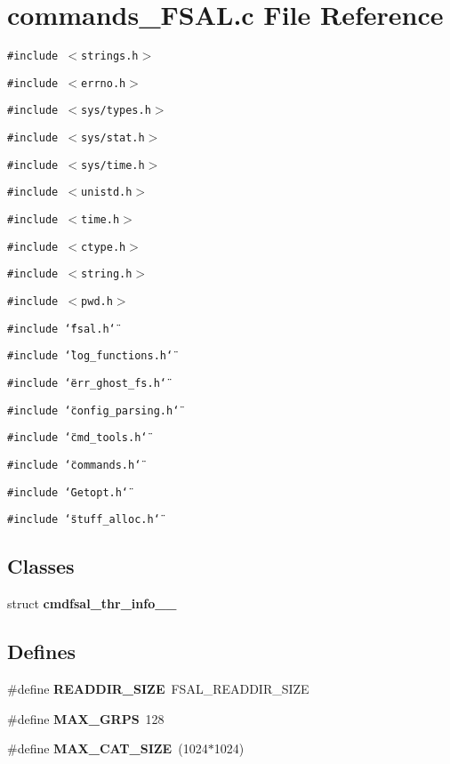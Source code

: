\section{commands\_\-FSAL.c File Reference}
\label{commands__FSAL_8c}
{\tt \#include $<$strings.h$>$}\par
{\tt \#include $<$errno.h$>$}\par
{\tt \#include $<$sys/types.h$>$}\par
{\tt \#include $<$sys/stat.h$>$}\par
{\tt \#include $<$sys/time.h$>$}\par
{\tt \#include $<$unistd.h$>$}\par
{\tt \#include $<$time.h$>$}\par
{\tt \#include $<$ctype.h$>$}\par
{\tt \#include $<$string.h$>$}\par
{\tt \#include $<$pwd.h$>$}\par
{\tt \#include \char`\"{}fsal.h\char`\"{}}\par
{\tt \#include \char`\"{}log\_\-functions.h\char`\"{}}\par
{\tt \#include \char`\"{}err\_\-ghost\_\-fs.h\char`\"{}}\par
{\tt \#include \char`\"{}config\_\-parsing.h\char`\"{}}\par
{\tt \#include \char`\"{}cmd\_\-tools.h\char`\"{}}\par
{\tt \#include \char`\"{}commands.h\char`\"{}}\par
{\tt \#include \char`\"{}Getopt.h\char`\"{}}\par
{\tt \#include \char`\"{}stuff\_\-alloc.h\char`\"{}}\par
\subsection*{Classes}
\begin{CompactItemize}
\item 
struct {\bf cmdfsal\_\-thr\_\-info\_\-\_\-}
\end{CompactItemize}
\subsection*{Defines}
\begin{CompactItemize}
\item 
\#define {\bf READDIR\_\-SIZE}~FSAL\_\-READDIR\_\-SIZE
\item 
\#define {\bf MAX\_\-GRPS}~128
\item 
\#define {\bf MAX\_\-CAT\_\-SIZE}~(1024$\ast$1024)
\end{CompactItemize}
